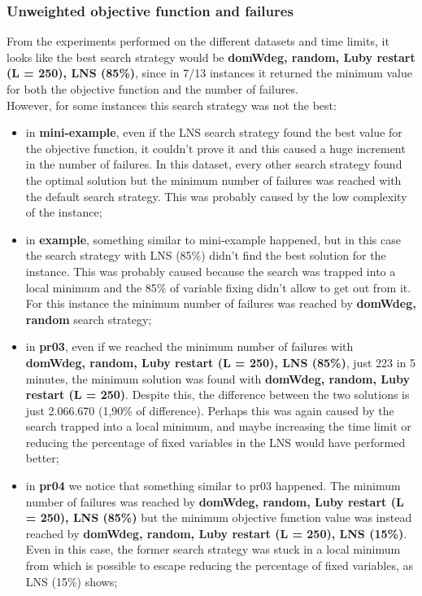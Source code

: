 \subsubsection{Unweighted objective function and failures}
From the experiments performed on the different datasets and time limits, it looks like the best search strategy would be \textbf{domWdeg, random, Luby restart (L = 250), LNS (85\%)}, since in 7/13 instances it returned the minimum value for both the objective function and the number of failures.\\
However, for some instances this search strategy was not the best:
\begin{itemize}
    \item in \textbf{mini-example}, even if the LNS search strategy found the best value for the objective function, it couldn't prove it and this caused a huge increment in the number of failures. In this dataset, every other search strategy found the optimal solution but the minimum number of failures was reached with the default search strategy. This was probably caused by the low complexity of the instance;
    \item in \textbf{example}, something similar to mini-example happened, but in this case the search strategy with LNS (85\%) didn't find the best solution for the instance. This was probably caused because the search was trapped into a local minimum and the 85\% of variable fixing didn't allow to get out from it. For this instance the minimum number of failures was reached by \textbf{domWdeg, random} search strategy;
    \item in \textbf{pr03}, even if we reached the minimum number of failures with \textbf{domWdeg, random, Luby restart (L = 250), LNS (85\%)}, just 223 in 5 minutes, the minimum solution was found with \textbf{domWdeg, random, Luby restart (L = 250)}. Despite this, the difference between the two solutions is just 2.066.670 (1,90\% of difference). Perhaps this was again caused by the search trapped into a local minimum, and maybe increasing the time limit or reducing the percentage of fixed variables in the LNS would have performed better;
    \item in \textbf{pr04} we notice that something similar to pr03 happened. The minimum number of failures was reached by \textbf{domWdeg, random, Luby restart (L = 250), LNS (85\%)} but the minimum objective function value was instead reached by \textbf{domWdeg, random, Luby restart (L = 250), LNS (15\%)}. Even in this case, the former search strategy was stuck in a local minimum from which is possible to escape reducing the percentage of fixed variables, as LNS (15\%) shows;

\end{itemize}
